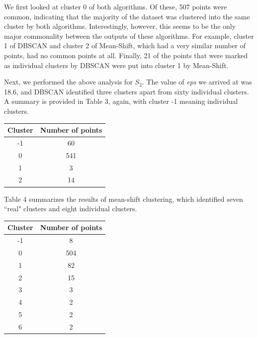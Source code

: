 \documentclass[12pt,a4paper,twocolumn]{article}
\begin{document}
We first looked at cluster 0 of both algorithms. Of these, 507 points were common, indicating that the majority of the dataset was clustered into the same cluster by both algorithms. Interestingly, however, this seems to be the only major commonality between the outputs of these algorithms. For example, cluster 1 of DBSCAN and cluster 2 of Mean-Shift, which had a very similar number of points, had no common points at all. Finally, 21 of the points that were marked as individual clusters by DBSCAN were put into cluster 1 by Mean-Shift.

Next, we performed the above analysis for $S_2$. The value of \textit{eps} we arrived at was 18.6, and DBSCAN identified three clusters apart from sixty individual clusters. A summary is provided in Table 3, again, with cluster -1 meaning individual clusters.\\

\begin{tabular}{|c|c|}
\hline 
\textbf{Cluster} & \textbf{Number of points} \\ 
\hline 
-1 & 60 \\ 
\hline 
0 & 541 \\ 
\hline 
1 & 3 \\ 
\hline 
2 & 14 \\ 
\hline 
\end{tabular} 
\begingroup
{}
\endgroup
\hfill\break

Table 4 summarizes the results of mean-shift clustering, which identified seven ``real" clusters and eight individual clusters.\\

\begin{tabular}{|c|c|}
\hline 
\textbf{Cluster} & \textbf{Number of points} \\ 
\hline 
-1 & 8 \\ 
\hline 
0 & 504 \\ 
\hline 
1 & 82 \\ 
\hline 
2 & 15 \\ 
\hline 
3 & 3 \\ 
\hline 
4 & 2 \\ 
\hline 
5 & 2 \\ 
\hline 
6 & 2 \\ 
\hline 
\end{tabular} 
\begingroup
{}
\endgroup
\hfill\break
\end{document}
